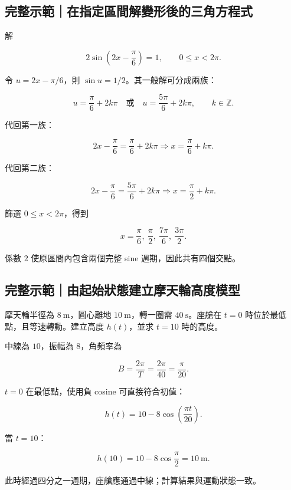 \documentclass[11pt,a4paper]{article}
\begin{document}
\begin{HandoutWorkedExample}

\subsection{完整示範｜在指定區間解變形後的三角方程式}\label{ux5b8cux6574ux793aux7bc4ux5728ux6307ux5b9aux5340ux9593ux89e3ux8b8aux5f62ux5f8cux7684ux4e09ux89d2ux65b9ux7a0bux5f0f}

解

\[
2\sin\left(2x-\frac\pi6\right)=1,
\qquad 0\le x<2\pi.
\]

令 \(u=2x-\pi/6\)，則 \(\sin u=1/2\)。其一般解可分成兩族：

\[
u=\frac\pi6+2k\pi
\quad\text{或}\quad
u=\frac{5\pi}{6}+2k\pi,
\qquad k\in\mathbb Z.
\]

代回第一族：

\[
2x-\frac\pi6=\frac\pi6+2k\pi
\Longrightarrow
x=\frac\pi6+k\pi.
\]

代回第二族：

\[
2x-\frac\pi6=\frac{5\pi}{6}+2k\pi
\Longrightarrow
x=\frac\pi2+k\pi.
\]

篩選 \(0\le x<2\pi\)，得到

\[
\boxed{x=\frac\pi6,\ \frac\pi2,\ \frac{7\pi}{6},\ \frac{3\pi}{2}}.
\]

係數 \(2\) 使原區間內包含兩個完整 sine 週期，因此共有四個交點。

\end{HandoutWorkedExample}

\begin{HandoutWorkedExample}

\subsection{完整示範｜由起始狀態建立摩天輪高度模型}\label{ux5b8cux6574ux793aux7bc4ux7531ux8d77ux59cbux72c0ux614bux5efaux7acbux6469ux5929ux8f2aux9ad8ux5ea6ux6a21ux578b}

摩天輪半徑為 \(8\ \mathrm m\)，圓心離地 \(10\ \mathrm m\)，轉一圈需 \(40\ \mathrm s\)。座艙在 \(t=0\) 時位於最低點，且等速轉動。建立高度 \(h(t)\)，並求 \(t=10\) 時的高度。

中線為 \(10\)，振幅為 \(8\)，角頻率為

\[
B=\frac{2\pi}{T}=\frac{2\pi}{40}=\frac\pi{20}.
\]

\(t=0\) 在最低點，使用負 cosine 可直接符合初值：

\[
\boxed{h(t)=10-8\cos\left(\frac{\pi t}{20}\right)}.
\]

當 \(t=10\)：

\[
h(10)=10-8\cos\frac\pi2=\boxed{10\ \mathrm m}.
\]

此時經過四分之一週期，座艙應通過中線；計算結果與運動狀態一致。

\end{HandoutWorkedExample}
\end{document}
